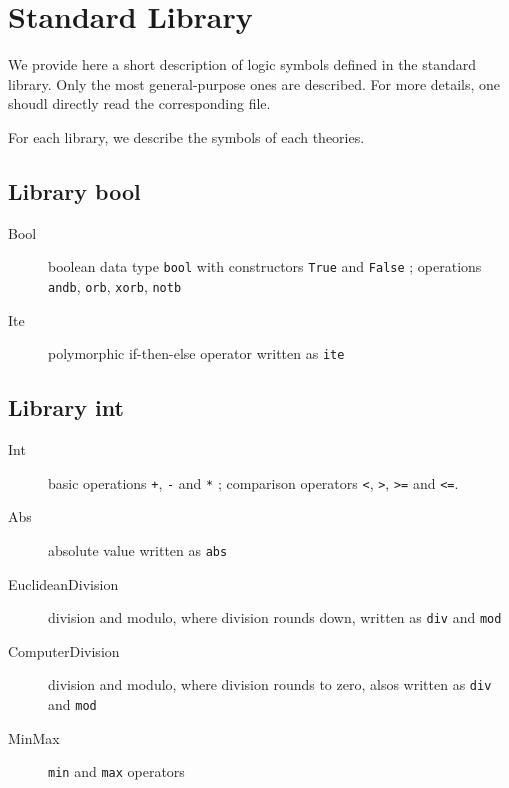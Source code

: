 \chapter{Standard Library}
\label{chap:library}

We provide here a short description of logic symbols defined in the
standard library. Only the most general-purpose ones are
described. For more details, one shoudl directly read the
corresponding file.

For each library, we describe the symbols of each theories.

\section{Library bool}

\begin{description}

\item[Bool] boolean data type \verb|bool| with constructors \verb|True| and
  \verb|False| ; operations \verb|andb|, \verb|orb|, \verb|xorb|, \verb|notb|

\item[Ite] polymorphic if-then-else operator written as \verb|ite|

\end{description}

\section{Library int}

\begin{description}

\item[Int] basic operations \verb|+|, \verb|-| and \verb|*| ; comparison
  operators \verb|<|, \verb|>|, \verb|>=| and \verb|<=|.

\item[Abs] absolute value written as \verb|abs|

\item[EuclideanDivision] division and modulo, where division rounds
  down, written as \verb|div| and \verb|mod|

\item[ComputerDivision] division and modulo, where division rounds to
  zero, alsos written as \verb|div| and \verb|mod|

\item[MinMax] \verb|min| and \verb|max| operators

\end{description}

